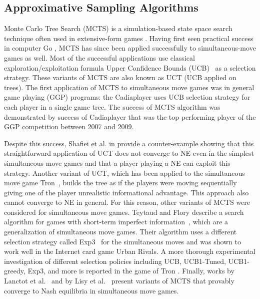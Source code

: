 \subsection{Approximative Sampling Algorithms}

Monte Carlo Tree Search (MCTS) is a simulation-based state space search technique often used in extensive-form games \cite{Coulom06,UCT}. 
Having first seen practical success in computer Go \cite{Gelly12}, MCTS has since been applied successfully to simultaneous-move games as well. 
Most of the successful applications use classical exploration/exploitation formula Upper Confidence Bounds (UCB)~\cite{UCB} as a selection strategy. These variants of MCTS are also known as UCT (UCB applied on trees). The first application of MCTS to simultaneous move games was in general game playing (GGP) \cite{Cadiaplayer} programs: the Cadiaplayer \cite{Cadiaplayer,Finnsson12} uses UCB selection strategy for each player in a single game tree. The success of MCTS algorithm was demonstrated by success of Cadiaplayer that was the top performing player of the GGP competition
between 2007 and 2009. 

Despite this success, Shafiei et al. in \cite{Shafiei09} provide a counter-example showing that this straightforward application of UCT does not
converge to NE even in the simplest simultaneous move games and that a player playing a NE can exploit this strategy. Another variant of UCT, which has been applied to the simultaneous move game Tron~\cite{Samothrakis10Tron}, builds the tree as if the players were moving sequentially giving one of the player unrealistic informational advantage. This approach also cannot converge to NE in general. For this reason, other variants of MCTS were considered for simultaneous move games. Teytaud and Flory describe a search algorithm for games with short-term imperfect information~\cite{Teytaud11Upper}, which are a generalization of simultaneous move games. Their algorithm uses a different selection strategy called Exp3~\cite{Auer2003Exp3} for the simultaneous moves and was shown to work well in the Internet card game Urban Rivals. 
A more thorough experimental investigation of different selection policies including UCB, UCB1-Tuned, UCB1-greedy, Exp3, and more is reported in the game of Tron \cite{Perick12Comparison}. Finally, works by Lanctot et al.~\cite{Lanctot13Goofspiel} and by Lisy et al.~\cite{lisy2013-nips} present variants of MCTS that provably converge to Nash equilibria in simultaneous move games.


